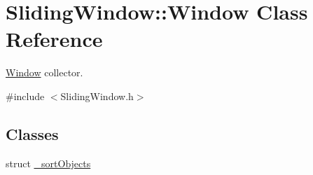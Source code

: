 \hypertarget{classSlidingWindow_1_1Window}{}\section{Sliding\+Window\+:\+:Window Class Reference}
\label{classSlidingWindow_1_1Window}


\hyperlink{classSlidingWindow_1_1Window}{Window} collector.  




{\ttfamily \#include $<$Sliding\+Window.\+h$>$}

\subsection*{Classes}
\begin{DoxyCompactItemize}
\item 
struct \hyperlink{structSlidingWindow_1_1Window_1_1__sortObjects}{\+\_\+sort\+Objects}
\end{DoxyCompactItemize}
